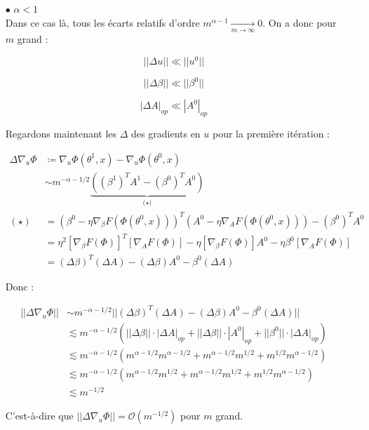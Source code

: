 \documentclass[a4paper, 11pt, french]{article}
\theoremstyle{definition}
\begin{document}
	\begin{itemize}
		\item[$\bullet$] $\alpha < 1$ \\
		
		Dans ce cas là, tous les écarts relatifs d'ordre $m^{\alpha - 1} \xrightarrow[m \to \infty]{} 0$. On a donc pour $m$ grand :
		
		\[||\Delta u|| \ll ||u^0||\]
		
		\[||\Delta \beta|| \ll ||\beta^0||\]
		
		\[|\Delta A|_{op} \ll |A^0|_{op}\]

		Regardons maintenant les $\Delta$ des gradients en $u$ pour la première itération :
		
		\begin{align}
			\Delta \nabla_u \Phi &\coloneqq \nabla_u \Phi (\theta^1, x) -  \nabla_u \Phi (\theta^0, x) \\
			&\sim m^{-\alpha - 1/2} \underbrace{((\beta^1)^T A^1 - (\beta^0)^T A^0)}_\text{($\star$)} \\
			 (\star) &= (\beta^0 - \eta \nabla_{\beta} F(\Phi(\theta^0, x)))^T (A^0 - \eta \nabla_{A} F(\Phi(\theta^0, x))) - (\beta^0)^T A^0 \\
			&= \eta^2 [\nabla_{\beta} F(\Phi)]^T[\nabla_{A} F(\Phi)] - \eta [\nabla_{\beta} F(\Phi)] A^0 - \eta \beta^0 [\nabla_{A} F(\Phi)] \\
			&= (\Delta \beta)^T(\Delta A) - (\Delta \beta) A^0 -  \beta^0 (\Delta A)
		\end{align}
	
	Donc :
	
	\begin{align}
		||\Delta \nabla_u \Phi|| &\sim m^{-\alpha - 1/2} ||(\Delta \beta)^T(\Delta A) - (\Delta \beta) A^0 -  \beta^0 (\Delta A)|| \\
		&\lesssim m^{-\alpha - 1/2} (||\Delta \beta|| \cdot |\Delta A|_{op} + ||\Delta \beta|| \cdot |A^0|_{op} + ||\beta^0|| \cdot |\Delta A|_{op}) \\
		&\lesssim m^{-\alpha - 1/2} (m^{\alpha - 1/2}m^{\alpha - 1/2} + m^{\alpha - 1/2}m^{1/2} + m^{1/2}m^{\alpha - 1/2}) \\
		&\lesssim m^{-\alpha - 1/2} (m^{\alpha - 1/2}m^{1/2} + m^{\alpha - 1/2}m^{1/2} + m^{1/2}m^{\alpha - 1/2}) \\
		&\lesssim m^{-1/2}
	\end{align}

	C'est-à-dire que $||\Delta \nabla_u \Phi|| = \mathcal{O}(m^{-1/2})$ pour $m$ grand. \\
	

\end{itemize}
\end{document}
